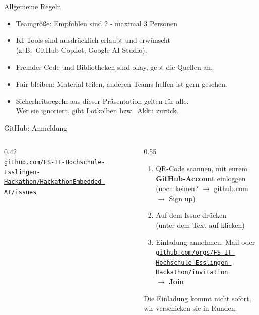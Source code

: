 \documentclass[10pt]{beamer}
\newcommand\urls[1]{\href{https://#1}{\nolinkurl{#1}}}
\begin{document}
\begin{frame}{Allgemeine Regeln}
  \begin{itemize}
    \item Teamgröße: Empfohlen sind 2 - maximal 3 Personen
    \item KI-Tools sind ausdrücklich erlaubt und erwünscht\\
          (z.\,B.\ GitHub Copilot, Google AI Studio).
    \item Fremder Code und Bibliotheken sind okay, gebt die Quellen an.
    \item Fair bleiben: Material teilen, anderen Teams helfen ist gern gesehen.
    \item Sicherheitsregeln aus dieser Präsentation gelten für alle.\\
          Wer sie ignoriert, gibt Lötkolben bzw.\ Akku zurück.
  \end{itemize}
\end{frame}

\begin{frame}{GitHub: Anmeldung}
  \begin{columns}[c]
    \begin{column}{0.42\textwidth}
      \centering
      \\[0.4em]
      {\scriptsize\urls{github.com/FS-IT-Hochschule-Esslingen-Hackathon/HackathonEmbedded-AI/issues}}
    \end{column}
    \begin{column}{0.55\textwidth}
      \begin{enumerate}
        \item QR-Code scannen, mit eurem \textbf{GitHub-Account} einloggen\\
              {\small(noch keinen? \(\rightarrow\) github.com \(\rightarrow\) Sign up)}
        \item Auf dem Issue \textbf{\faThumbsUp} drücken\\
              {\small(unter dem Text auf \faSmileO{} klicken)}
        \item Einladung annehmen: Mail oder\\
              {\small\urls{github.com/orgs/FS-IT-Hochschule-Esslingen-Hackathon/invitation}}\\
              \(\rightarrow\) \textbf{Join}
      \end{enumerate}
      \vspace{0.3em}
      {\small Die Einladung kommt nicht sofort, wir verschicken sie in Runden.}
    \end{column}
  \end{columns}
\end{frame}
\end{document}
